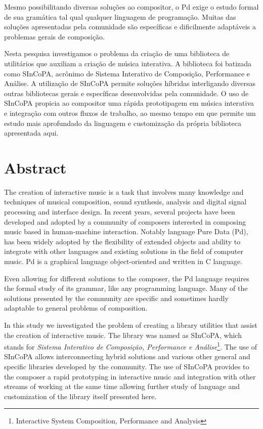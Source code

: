 \documentclass{ppgmus}
\begin{document}
Mesmo possibilitando diversas soluções ao compositor, o Pd exige
o estudo formal de sua gramática tal qual qualquer linguagem de 
programação. Muitas das soluções apresentadas pela comunidade
são específicas e dificilmente adaptáveis a problemas gerais de 
composição.

Nesta pesquisa investigamos o problema da criação de uma biblioteca
de utilitários que auxiliam a criação de música interativa. 
A biblioteca foi batizada como SInCoPA, acrônimo de Sistema Interativo
de Composição, Performance e Análise.
A utilização de SInCoPA permite
soluções híbridas interligando diversas outras bibliotecas gerais e
específicas desenvolvidas pela comunidade. O uso de SInCoPA
propicia ao compositor uma rápida prototipagem em música interativa e 
integração com outros fluxos de trabalho, ao mesmo tempo em que permite
um estudo mais aprofundado da linguagem e customização da própria biblioteca
apresentada aqui.



\chapter*{Abstract}
\label{cha:abstract}

The creation of interactive music is a task that involves many
knowledge and techniques of musical composition, sound synthesis,
analysis and digital signal processing and interface design.
In recent years, several projects have been developed and adopted by a
community of composers interested in composing music based
in human-machine interaction. Notably language Pure Data (Pd),
has been widely adopted by the flexibility of extended objects
and ability to integrate with other languages ​​and existing solutions
in the field of computer music. Pd is a graphical language object-oriented
and written in C language.

Even allowing for different solutions to the composer, the Pd language requires
the formal study of its grammar, like any programming language. 
Many of the solutions presented by the community
are specific and sometimes hardly adaptable to general problems of
composition.

In this study we investigated the problem of creating a library
utilities that assist the creation of interactive music.
The library was named as SInCoPA, which stands for \textit{Sistema Interativo
de Composição, Performance e Análise}\footnote{Interactive System
Composition, Performance and Analysis}.
The use of SInCoPA allows
interconnecting hybrid solutions and various other general and specific libraries
 developed by the community. The use of SInCoPA
 provides to the composer a rapid prototyping in interactive music and
integration with other streams of working at the same time allowing
further study of language and customization of the library itself
presented here.
\end{document}
